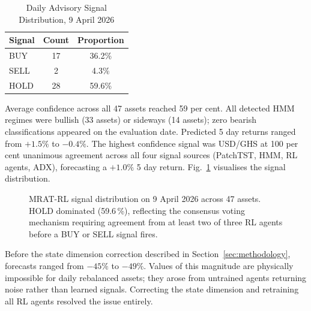 \documentclass[journal]{IEEEtran}
\begin{document}
\begin{table}[!t]
\renewcommand{\arraystretch}{1.3}
\caption{Daily Advisory Signal Distribution, 9 April 2026}
\label{tab:signals}
\centering
\begin{tabular}{|l|c|c|}
\hline
\textbf{Signal} & \textbf{Count} & \textbf{Proportion} \\
\hline
BUY  & 17 & 36.2\% \\
SELL &  2 &  4.3\% \\
HOLD & 28 & 59.6\% \\
\hline
\end{tabular}
\end{table}

Average confidence across all 47 assets reached 59 per cent. All
detected HMM regimes were bullish (33 assets) or sideways (14 assets);
zero bearish classifications appeared on the evaluation date. Predicted
5 day returns ranged from $+1.5\%$ to $-0.4\%$. The highest confidence
signal was USD/GHS at 100 per cent unanimous agreement across all four
signal sources (PatchTST, HMM, RL agents, ADX), forecasting a $+1.0\%$
5 day return. Fig.~\ref{fig:signals} visualises the signal distribution.

\begin{figure}[!t]
\centering
{}
\caption{MRAT-RL signal distribution on 9 April 2026 across 47 assets.
HOLD dominated (59.6\,\%), reflecting the consensus voting mechanism
requiring agreement from at least two of three RL agents before a BUY
or SELL signal fires.}
\label{fig:signals}
\end{figure}

Before the state dimension correction described in
Section~\ref{sec:methodology}, forecasts ranged from $-45\%$ to $-49\%$.
Values of this magnitude are physically impossible for daily rebalanced
assets; they arose from untrained agents returning noise rather than
learned signals. Correcting the state dimension and retraining all RL
agents resolved the issue entirely.
\end{document}

